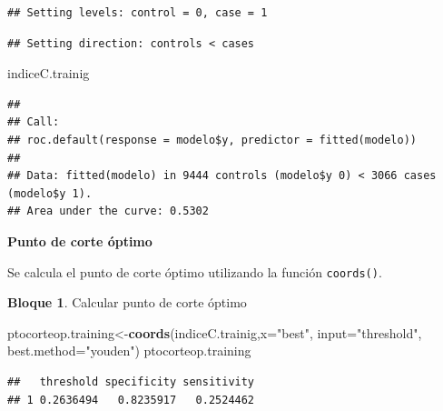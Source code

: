 \documentclass[]{book}
\newenvironment{Shaded}{\begin{snugshade}}{\end{snugshade}}
\newcommand{\CommentTok}[1]{\textcolor[rgb]{0.56,0.35,0.01}{\textit{#1}}}
\newcommand{\DataTypeTok}[1]{\textcolor[rgb]{0.13,0.29,0.53}{#1}}
\newcommand{\KeywordTok}[1]{\textcolor[rgb]{0.13,0.29,0.53}{\textbf{#1}}}
\newcommand{\NormalTok}[1]{#1}
\newcommand{\OperatorTok}[1]{\textcolor[rgb]{0.81,0.36,0.00}{\textbf{#1}}}
\newcommand{\StringTok}[1]{\textcolor[rgb]{0.31,0.60,0.02}{#1}}
\theoremstyle{definition}
\theoremstyle{definition}
\newtheorem{example}{Bloque}[chapter]
\theoremstyle{definition}
\theoremstyle{definition}
\theoremstyle{remark}
\begin{document}
\begin{Shaded}
\end{Shaded}

\begin{verbatim}
## Setting levels: control = 0, case = 1
\end{verbatim}

\begin{verbatim}
## Setting direction: controls < cases
\end{verbatim}

\begin{Shaded}
\begin{Highlighting}[]
\NormalTok{indiceC.trainig}
\end{Highlighting}
\end{Shaded}

\begin{verbatim}
## 
## Call:
## roc.default(response = modelo$y, predictor = fitted(modelo))
## 
## Data: fitted(modelo) in 9444 controls (modelo$y 0) < 3066 cases (modelo$y 1).
## Area under the curve: 0.5302
\end{verbatim}

\textbf{Punto de corte óptimo}

Se calcula el punto de corte óptimo utilizando la función \texttt{coords()}.

\begin{example}
\protect\hypertarget{exm:bloque84nbm}{}{\label{exm:bloque84nbm} }Calcular punto de corte óptimo
\end{example}

\begin{Shaded}
\begin{Highlighting}[]
\NormalTok{ptocorteop.training<-}\KeywordTok{coords}\NormalTok{(indiceC.trainig,}\DataTypeTok{x=}\StringTok{"best"}\NormalTok{,}
                            \DataTypeTok{input=}\StringTok{"threshold"}\NormalTok{,}
                            \DataTypeTok{best.method=}\StringTok{"youden"}\NormalTok{)}
\NormalTok{ptocorteop.training}
\end{Highlighting}
\end{Shaded}

\begin{verbatim}
##   threshold specificity sensitivity
## 1 0.2636494   0.8235917   0.2524462
\end{verbatim}
\end{document}
